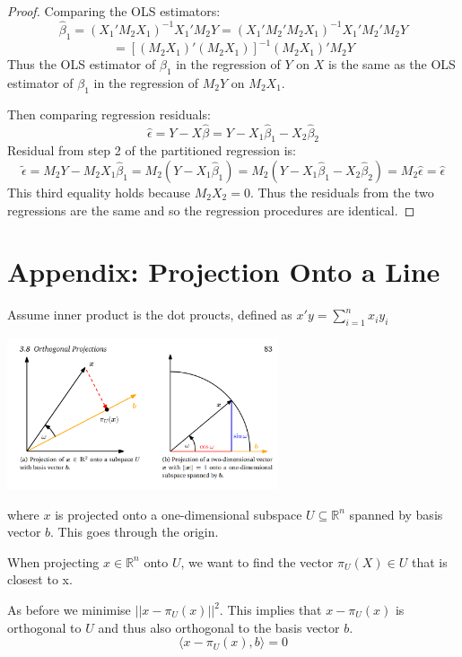 \documentclass[DIV=14,titlepage=false]{scrreprt}
\begin{document}
\begin{proof}
Comparing the OLS estimators:
\[\hat{\beta}_1=(X_1'M_2X_1)^{-1}X_1'M_2Y=(X_1'M_2'M_2X_1)^{-1}X_1'M_2'M_2Y\]
\[=[(M_2X_1)'(M_2X_1)]^{-1}(M_2X_1)'M_2Y\]
Thus the OLS estimator of \(\beta_1\) in the regression of \(Y\) on \(X\) is the same as the OLS estimator of \(\beta_1\) in the regression of \(M_2Y\) on \(M_2X_1\).

Then comparing regression residuals:
\[\hat{\epsilon}=Y-X\hat{\beta}=Y-X_1\hat\beta_1-X_2\hat\beta_2\]
Residual from step 2 of the partitioned regression is:
\[\tilde{\epsilon}=M_2Y-M_2X_1\hat{\beta}_1 = M_2(Y-X_1\hat{\beta}_1)=M_2(Y-X_1\hat{\beta}_1-X_2\hat{\beta}_2)=M_2\hat{\epsilon}=\hat{\epsilon}\]
This third equality holds because \(M_2X_2=0\). Thus the residuals from the two regressions are the same and so the regression procedures are identical.

\end{proof}

\section{Appendix: Projection Onto a Line}

Assume inner product is the dot proucts, defined as \(x'y=\sum_{i=1}^{n}x_iy_i\)

\begin{center} 
\includegraphics[width=0.6\textwidth]{./Images/Projection onto a line.png}
\end{center}

where \(x\) is projected onto a one-dimensional subspace \(U\subseteq\mathbb{R}^n\) spanned by basis vector \(b\). This goes through the origin.

When projecting \(x \in \mathbb{R}^n\) onto \(U\), we want to find the vector \(\pi_U(X) \in U \) that is closest to x.

\begin{prop}
  
  As before we minimise \(||x-\pi_U(x)||^2\). This implies that \(x-\pi_U(x)\) is orthogonal to \(U\) and thus also orthogonal to the basis vector \(b\).
  \[\langle x-\pi_U(x),b \rangle = 0\]
\end{prop}
\end{document}
